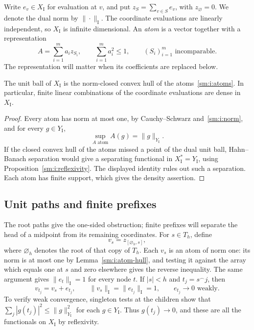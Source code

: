 Write $e_v\in X_{\mathrm I}$ for evaluation at $v$, and put
$z_S=\sum_{v\in S}e_v$, with $z_\varnothing=0$.  We denote the dual norm
by $\|\cdot\|_{\mathrm I}$.  The coordinate evaluations are linearly
independent, so $X_{\mathrm I}$ is infinite dimensional.  An \emph{atom}
is a vector together with a representation
\begin{equation}
 A=\sum_{i=1}^m a_i z_{S_i},
 \qquad \sum_{i=1}^m a_i^2\leq1,
 \qquad (S_i)_{i=1}^m\text{ incomparable}.
 \label{sm:i:atoms}
\end{equation}
The representation will matter when its coefficients are replaced below.

\begin{lemma}\label{sm:i:atom-hull}
The unit ball of $X_{\mathrm I}$ is the norm-closed convex hull of the
atoms~\eqref{sm:i:atoms}.  In particular, finite linear combinations of
the coordinate evaluations are dense in $X_{\mathrm I}$.
\end{lemma}

\begin{proof}
Every atom has norm at most one, by Cauchy--Schwarz
and~\eqref{sm:i:norm}, and for every $g\in Y_{\mathrm I}$,
\[
 \sup_{A\text{ atom}} A(g)=\|g\|_{Y_{\mathrm I}}.
\]
If the closed convex hull of the atoms missed a point of the dual unit
ball, Hahn--Banach separation would give a separating functional in
$X_{\mathrm I}^*=Y_{\mathrm I}$, using Proposition~\ref{sm:i:reflexivity}.
The displayed identity rules out such a separation.  Each atom has
finite support, which gives the density assertion.
\end{proof}

\subsection{Unit paths and finite prefixes}

The root paths give the one-sided obstruction; finite prefixes will
separate the head of a midpoint from its remaining coordinates.
For $s\in T_h$, define
\[
 v_s=z_{[\varnothing_h,s]},
\]
where $\varnothing_h$ denotes the root of that copy of $T_h$.
Each $v_s$ is an atom of norm one: its norm is at most one by
Lemma~\ref{sm:i:atom-hull}, and testing it against the array which equals
one at $s$ and zero elsewhere gives the reverse inequality.  The same
argument gives $\|e_t\|_{\mathrm I}=1$ for every node $t$.
If $|s|<h$ and $t_j=s^\frown j$, then
\begin{equation}
 v_{t_j}=v_s+e_{t_j},\qquad
 \|v_s\|_{\mathrm I}=\|e_{t_j}\|_{\mathrm I}=1,
 \qquad e_{t_j}\longrightarrow0\text{ weakly}.
 \label{sm:i:paths}
\end{equation}
To verify weak convergence, singleton tests at the children show that
$\sum_j|g(t_j)|^2\leq\|g\|_{Y_{\mathrm I}}^2$ for each
$g\in Y_{\mathrm I}$.  Thus $g(t_j)\to0$, and these are all the
functionals on $X_{\mathrm I}$ by reflexivity.

